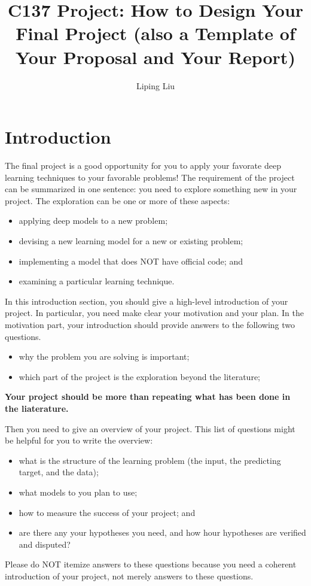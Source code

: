 \documentclass[11pt]{article}
\title{C137 Project: How to Design Your Final Project (also a Template of Your Proposal and Your Report)}
\author{Liping Liu}
\date{}
\begin{document}
\maketitle

\section{Introduction}

The final project is a good opportunity for you to apply your favorate deep learning techniques to your favorable problems! The requirement of the project can be summarized in one sentence: you need to explore something new in your project. The exploration can be one or more of these aspects:  
\begin{itemize}
\item applying deep models to a new problem;   
\item devising a new learning model for a new or existing problem;    
\item implementing a model that does NOT have official code; and 
\item examining a particular learning technique.
\end{itemize}

In this introduction section, you should give a high-level introduction of your project. In particular, you need make clear your motivation and your plan. In the motivation part, your introduction should provide answers to the following two questions.  
\begin{itemize}
\item why the problem you are solving is important; 
\item which part of the project is the exploration beyond the literature;
\end{itemize}
\textbf{Your project should be more than repeating what has been done in the liaterature.} 

Then you need to give an overview of your project. This list of questions might be helpful for you to write the overview: 
\begin{itemize}
\item what is the structure of the learning problem (the input, the predicting target, and the data);   
\item what models to you plan to use;  
\item how to measure the success of your project; and   
\item are there any your hypotheses you need, and how hour hypotheses are verified and disputed? 
\end{itemize}
Please do NOT itemize answers to these questions because you need a coherent introduction of your project, not merely answers to these questions. 
\end{document}

